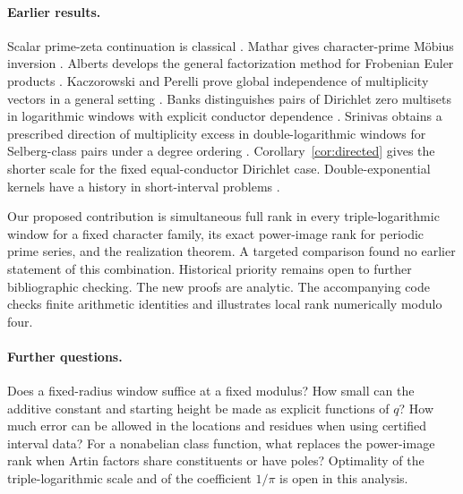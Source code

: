 \documentclass[11pt,letterpaper]{article}
\begin{document}
\paragraph{Earlier results.}
Scalar prime-zeta continuation is classical \cite{froberg}. Mathar gives character-prime M\"obius inversion \cite{mathar}. Alberts develops the general factorization method for Frobenian Euler products \cite{alberts}. Kaczorowski and Perelli prove global independence of multiplicity vectors in a general setting \cite[Lemma 2]{kp}. Banks distinguishes pairs of Dirichlet zero multisets in logarithmic windows with explicit conductor dependence \cite{banks}. Srinivas obtains a prescribed direction of multiplicity excess in double-logarithmic windows for Selberg-class pairs under a degree ordering \cite{srinivas}. Corollary~\ref{cor:directed} gives the shorter scale for the fixed equal-conductor Dirichlet case. Double-exponential kernels have a history in short-interval problems \cite{ivic}.

Our proposed contribution is simultaneous full rank in every triple-logarithmic window for a fixed character family, its exact power-image rank for periodic prime series, and the realization theorem. A targeted comparison found no earlier statement of this combination. Historical priority remains open to further bibliographic checking. The new proofs are analytic. The accompanying code checks finite arithmetic identities and illustrates local rank numerically modulo four.

\paragraph{Further questions.}
Does a fixed-radius window suffice at a fixed modulus? How small can the additive constant and starting height be made as explicit functions of $q$? How much error can be allowed in the locations and residues when using certified interval data? For a nonabelian class function, what replaces the power-image rank when Artin factors share constituents or have poles? Optimality of the triple-logarithmic scale and of the coefficient $1/\pi$ is open in this analysis.
\end{document}
